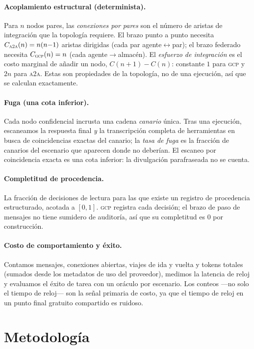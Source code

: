 \documentclass[10pt,twocolumn,letterpaper]{article}
\newcommand{\gcp}{\textsc{gcp}}
\newcommand{\ata}{\textsc{a2a}}
\begin{document}
\paragraph{Acoplamiento estructural (determinista).} Para $n$ nodos pares, las
\emph{conexiones por pares} son el número de aristas de integración que la
topología requiere. El brazo punto a punto necesita $C_{\ata{}}(n)=n(n{-}1)$
aristas dirigidas (cada par agente$\leftrightarrow$par); el brazo federado necesita
$C_{\gcp{}}(n)=n$ (cada agente$\rightarrow$almacén). El \emph{esfuerzo de
integración} es el costo marginal de añadir un nodo, $C(n{+}1)-C(n)$: constante $1$
para \gcp{} y $2n$ para \ata{}. Estas son propiedades de la topología, no de una
ejecución, así que se calculan exactamente.

\paragraph{Fuga (una cota inferior).} Cada nodo confidencial incrusta una cadena
\emph{canario} única. Tras una ejecución, escaneamos la respuesta final \emph{y}
la transcripción completa de herramientas en busca de coincidencias exactas del
canario; la \emph{tasa de fuga} es la fracción de canarios del escenario que
aparecen donde no deberían. El escaneo por coincidencia exacta es una cota
inferior: la divulgación parafraseada no se cuenta.

\paragraph{Completitud de procedencia.} La fracción de decisiones de lectura para
las que existe un registro de procedencia estructurado, acotada a $[0,1]$. \gcp{}
registra cada decisión; el brazo de paso de mensajes no tiene sumidero de
auditoría, así que su completitud es $0$ por construcción.

\paragraph{Costo de comportamiento y éxito.} Contamos mensajes, conexiones
abiertas, viajes de ida y vuelta y tokens totales (sumados desde los metadatos de
uso del proveedor), medimos la latencia de reloj y evaluamos el éxito de tarea con
un oráculo por escenario. Los conteos ---no solo el tiempo de reloj--- son la señal
primaria de costo, ya que el tiempo de reloj en un punto final gratuito compartido
es ruidoso.

\section{Metodología}
\label{sec:method}
\end{document}
